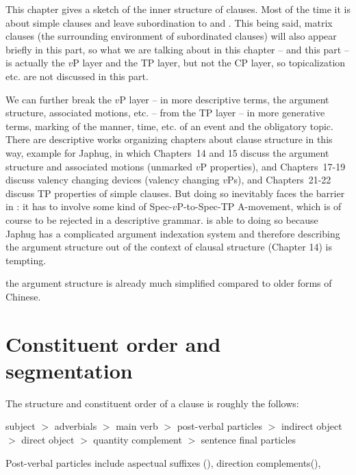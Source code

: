 \documentclass[../main.tex]{subfiles}
\begin{document}
This chapter gives a sketch of the inner structure of clauses.
Most of the time it is about simple clauses and leave subordination to 
 and .
This being said, matrix clauses (the surrounding environment of subordinated clauses)
will also appear briefly in this part, so what we are talking about in this chapter -- and this part -- is 
actually the $v$P layer and the TP layer, but not the CP layer, so topicalization etc. are not 
discussed in this part. 

We can further break the $v$P layer -- in more descriptive terms, the argument 
structure, associated motions, etc.
-- from the TP layer -- in more generative terms, marking of the manner, time, etc. of an event and the
obligatory topic. There are descriptive works organizing chapters about clause structure in this way, 
example \citet{jacques2021grammar} for Japhug, in which Chapters~14 and 15 discuss the argument structure 
and associated motions (unmarked $v$P properties), and Chapters~17-19 discuss valency changing devices 
(valency changing $v$Ps), and Chapters~21-22 discuss TP properties of simple clauses. 
But doing so inevitably faces the barrier in : 
it has to involve some kind of Spec-$v$P-to-Spec-TP A-movement, 
which is of course to be rejected in a descriptive grammar. 
\citet{jacques2021grammar} is able to doing so 
because Japhug has a complicated argument indexation system 
and therefore describing the argument structure out of the context of clausal structure (Chapter 14) is tempting.

the argument structure is already much simplified compared to older forms of Chinese.

\section{Constituent order and segmentation}\label{sec:clause-constituent-order-overview}

The structure and constituent order of a clause is roughly the follows:
\begin{exe}
    \ex\label{ex:clause-order} subject $>$ adverbials $>$ main verb $>$ post-verbal particles $>$ indirect object $>$ direct object $>$ quantity complement $>$ sentence final particles
\end{exe}
Post-verbal particles include aspectual suffixes (),
direction complements(), %
\end{document}
